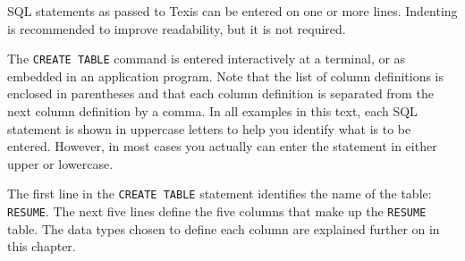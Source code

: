 SQL statements as passed to Texis can be entered on one or more lines.
Indenting is recommended to improve readability, but it is not
required.

The {\tt CREATE TABLE} command is entered interactively at a
terminal, or as embedded in an application program.  Note that the
list of column definitions is enclosed in parentheses and that each
column definition is separated from the next column definition by a
comma.  In all examples in this text, each SQL statement is shown in
uppercase letters to help you identify what is to be entered.
However, in most cases you actually can enter the statement in either
upper or lowercase.

The first line in the {\tt CREATE TABLE} statement identifies the name of
the table:  {\tt RESUME}.  The next five lines define the five columns that
make up the {\tt RESUME} table.  The data types chosen to define each column
are explained further on in this chapter.

